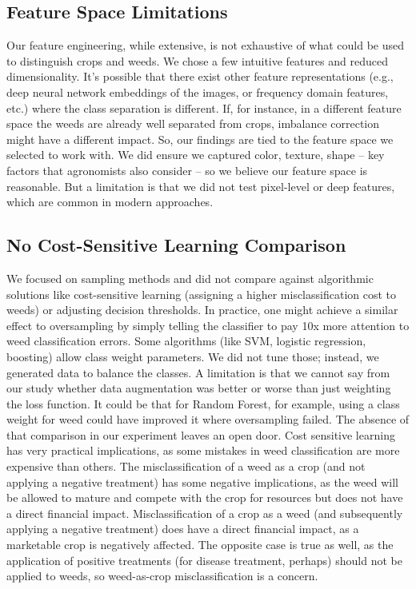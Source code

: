 \documentclass[letterpaper, notitlepage]{report}
\begin{document}
\subsection{Feature Space Limitations}
Our feature engineering, while extensive, is not exhaustive of what could be used to distinguish crops and weeds. We chose a few intuitive features and reduced dimensionality. It’s possible that there exist other feature representations (e.g., deep neural network embeddings of the images, or frequency domain features, etc.) where the class separation is different. If, for instance, in a different feature space the weeds are already well separated from crops, imbalance correction might have a different impact. So, our findings are tied to the feature space we selected to work with. We did ensure we captured color, texture, shape – key factors that agronomists also consider – so we believe our feature space is reasonable. But a limitation is that we did not test pixel-level or deep features, which are common in modern approaches.

\subsection{No Cost-Sensitive Learning Comparison}
We focused on sampling methods and did not compare against algorithmic solutions like cost-sensitive learning (assigning a higher misclassification cost to weeds) or adjusting decision thresholds. In practice, one might achieve a similar effect to oversampling by simply telling the classifier to pay 10x more attention to weed classification errors. Some algorithms (like SVM, logistic regression, boosting) allow class weight parameters. We did not tune those; instead, we generated data to balance the classes. A limitation is that we cannot say from our study whether data augmentation was better or worse than just weighting the loss function. It could be that for Random Forest, for example, using a class weight for weed could have improved it where oversampling failed. The absence of that comparison in our experiment leaves an open door. Cost sensitive learning has very practical implications, as some mistakes in weed classification are more expensive than others.  The misclassification of a weed as a crop (and not applying a negative treatment) has some negative implications, as the weed will be allowed to mature and compete with the crop for resources but does not have a direct financial impact. Misclassification of a crop as a weed (and subsequently applying a negative treatment) does have a direct financial impact, as a marketable crop is negatively affected. The opposite case is true as well, as the application of positive treatments (for disease treatment, perhaps) should not be applied to weeds, so weed-as-crop misclassification is a concern. 
\end{document}
